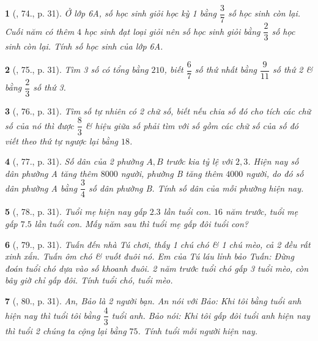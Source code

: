 \documentclass{article}
\newtheorem{baitoan}{}
\begin{document}
\begin{baitoan}[\cite{Binh_Toan_6_tap_2}, 74., p. 31]
	Ở lớp 6A, số học sinh giỏi học kỳ 1 bằng $\dfrac{3}{7}$ số học sinh còn lại. Cuối năm có thêm $4$ học sinh đạt loại giỏi nên số học sinh giỏi bằng $\dfrac{2}{3}$ số học sinh còn lại. Tính số học sinh của lớp 6A.
\end{baitoan}

\begin{baitoan}[\cite{Binh_Toan_6_tap_2}, 75., p. 31]
	Tìm 3 số có tổng bằng $210$, biết $\dfrac{6}{7}$ số thứ nhất bằng $\dfrac{9}{11}$ số thứ 2 \& bằng $\dfrac{2}{3}$ số thứ 3.
\end{baitoan}

\begin{baitoan}[\cite{Binh_Toan_6_tap_2}, 76., p. 31]
	Tìm số tự nhiên có 2 chữ số, biết nếu chia số đó cho tích các chữ số của nó thì được $\dfrac{8}{3}$ \& hiệu giữa số phải tìm với số gồm các chữ số của số đó viết theo thứ tự ngược lại bằng $18$.
\end{baitoan}

\begin{baitoan}[\cite{Binh_Toan_6_tap_2}, 77., p. 31]
	Số dân của 2 phường $A,B$ trước kia tỷ lệ với $2,3$. Hiện nay số dân phường A tăng thêm $8000$ người, phường B tăng thêm $4000$ người, do đó số dân phường A bằng $\dfrac{3}{4}$ số dân phường B. Tính số dân của mỗi phường hiện nay.
\end{baitoan}

\begin{baitoan}[\cite{Binh_Toan_6_tap_2}, 78., p. 31]
	Tuổi mẹ hiện nay gấp $2.3$ lần tuổi con. $16$ năm trước, tuổi mẹ gấp $7.5$ lần tuổi con. Mấy năm sau thì tuổi mẹ gấp đôi tuổi con?
\end{baitoan}

\begin{baitoan}[\cite{Binh_Toan_6_tap_2}, 79., p. 31]
	Tuấn đến nhà Tú chơi, thấy 1 chú chó \& 1 chú mèo, cả 2 đều rất xinh xắn. Tuấn ôm chó \& vuốt đuôi nó. Em của Tú láu lỉnh bảo Tuấn: Đừng đoán tuổi chó dựa vào số khoanh đuôi. 2 năm trước tuổi chó gấp 3 tuổi mèo, còn bây giờ chỉ gấp đôi. Tính tuổi chó, tuổi mèo.
\end{baitoan}

\begin{baitoan}[\cite{Binh_Toan_6_tap_2}, 80., p. 31]
	An, Bảo là 2 người bạn. An nói với Bảo: Khi tôi bằng tuổi anh hiện nay thì tuổi tôi bằng $\dfrac{4}{3}$ tuổi anh. Bảo nói: Khi tôi gấp đôi tuổi anh hiện nay thì tuổi 2 chúng ta cộng lại bằng $75$. Tính tuổi mỗi người hiện nay.
\end{baitoan}
\end{document}
